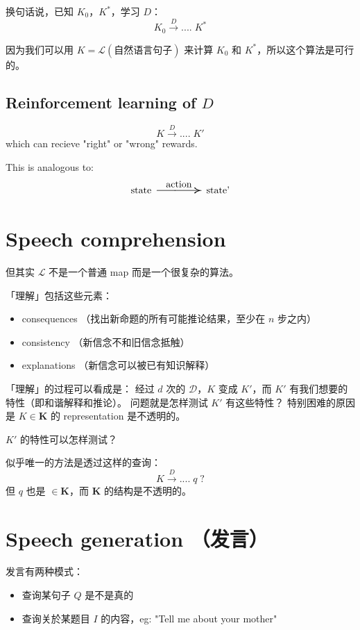 \documentclass[12pt]{article}
\begin{document}
换句话说，已知 $K_0$，$K^*$，学习 $D$：
$$ K_0 \stackrel{D}{\longrightarrow} .... \; K^* $$

因为我们可以用 $K = \mathcal{L}(\mbox{自然语言句子})$ 来计算 $K_0$ 和 $K^*$，所以这个算法是可行的。

\subsection{Reinforcement learning of \texorpdfstring{$D$}{D}}

$$ K \stackrel{D}{\longrightarrow} .... \; K' $$
which can recieve "right" or "wrong" rewards.

This is analogous to:
$$ \mbox{state} \stackrel{\mbox{action}}{\resizebox{1.8cm}{0.15cm}{$\longrightarrow$}} \mbox{state'}$$

\section{Speech comprehension}
\label{language-comprehension}

但其实 $\mathcal{L}$ 不是一个普通 map 而是一个很复杂的算法。

「理解」包括这些元素：
\begin{itemize}
\item consequences （找出新命题的所有可能推论结果，至少在 $n$ 步之内）
\item consistency （新信念不和旧信念抵触）
\item explanations （新信念可以被已有知识解释）
\end{itemize}

「理解」的过程可以看成是： 经过 $d$ 次的 $\mathcal{D}$，$K$ 变成 $K'$，而 $K'$ 有我们想要的特性（即和谐解释和推论）。  问题就是怎样测试 $K'$ 有这些特性？  特别困难的原因是 $K \in \mathbf{K}$ 的 representation 是不透明的。

$K'$ 的特性可以怎样测试？

似乎唯一的方法是透过这样的查询：
$$ K \stackrel{D}{\longrightarrow} .... \; q \; ? $$
但 $q$ 也是 $\in \mathbf{K}$，而 $\mathbf{K}$ 的结构是不透明的。

\section{Speech generation （发言）}

发言有两种模式：
\begin{itemize}
\item 查询某句子 $Q$ 是不是真的
\item 查询关於某题目 $I$ 的内容，eg: "Tell me about your mother"
\end{itemize}
\end{document}
